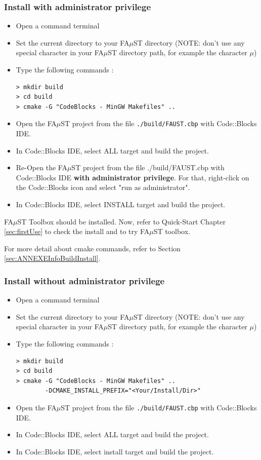 \subsubsection{Install with administrator privilege}
\label{sec:WinMinGWCodeBlocksAdminBasicInstall}
\begin{itemize}
\item Open a command terminal
\item Set the current directory to your FA$\mu$ST directory (NOTE: don't use any special character in your FA$\mu$ST directory path, for example the character $\mu$)
\item Type the following commands : 
\begin{lstlisting}
> mkdir build
> cd build
> cmake -G "CodeBlocks - MinGW Makefiles" .. 
\end{lstlisting}
\item Open the FA$\mu$ST project from the file \texttt{./build/FAUST.cbp} with Code::Blocks IDE.
\item In Code::Blocks IDE, select ALL target and build the project.
\item Re-Open the FA$\mu$ST project from the file ./build/FAUST.cbp with Code::Blocks IDE \textbf{with administrator privilege}. For that, right-click on the Code::Blocks icon and select "run as administrator". 
\item In Code::Blocks IDE, select INSTALL target and build the project.
\end{itemize}

FA$\mu$ST Toolbox should be installed. Now, refer to Quick-Start Chapter \ref{sec:firstUse} to check the install and to try FA$\mu$ST toolbox.

For more detail about cmake commands, refer to Section \ref{sec:ANNEXEInfoBuildInstall}.

\subsubsection{Install without administrator privilege}
\label{sec:WinMinGWCodeBlocksNoAdminBasicInstall}
\begin{itemize}
\item Open a command terminal
\item Set the current directory to your FA$\mu$ST directory (NOTE: don't use any special character in your FA$\mu$ST directory path, for example the character $\mu$)
\item Type the following commands : 
\begin{lstlisting}
> mkdir build
> cd build
> cmake -G "CodeBlocks - MinGW Makefiles" .. 
	    -DCMAKE_INSTALL_PREFIX="<Your/Install/Dir>"
\end{lstlisting}
\item Open the FA$\mu$ST project from the file \texttt{./build/FAUST.cbp} with Code::Blocks IDE.
\item In Code::Blocks IDE, select ALL target and build the project.
\item In Code::Blocks IDE, select install target and build the project.
\end{itemize}

